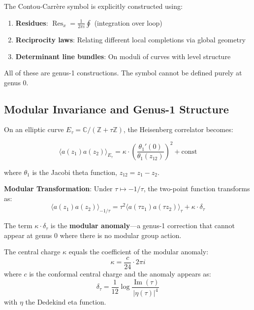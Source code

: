 \begin{remark}
The Contou-Carrère symbol is explicitly constructed using:
\begin{enumerate}
\item \textbf{Residues}: $\operatorname{Res}_x = \frac{1}{2\pi i} \oint$ (integration over loop)
\item \textbf{Reciprocity laws}: Relating different local completions via global geometry
\item \textbf{Determinant line bundles}: On moduli of curves with level structure
\end{enumerate}
All of these are genus-1 constructions. The symbol cannot be defined purely at genus 0.
\end{remark}

\subsection{Modular Invariance and Genus-1 Structure}

On an elliptic curve $E_\tau = \mathbb{C}/(\mathbb{Z} + \tau \mathbb{Z})$, the Heisenberg correlator becomes:

\begin{equation}
\langle a(z_1) a(z_2) \rangle_{E_\tau} = \kappa \cdot \left( \frac{\theta_1'(0)}{\theta_1(z_{12})} \right)^2 + \text{const}
\end{equation}

where $\theta_1$ is the Jacobi theta function, $z_{12} = z_1 - z_2$.

\textbf{Modular Transformation}:
Under $\tau \mapsto -1/\tau$, the two-point function transforms as:
\begin{equation}
\langle a(z_1) a(z_2) \rangle_{-1/\tau} = \tau^2 \langle a(\tau z_1) a(\tau z_2) \rangle_\tau + \kappa \cdot \delta_\tau
\end{equation}

The term $\kappa \cdot \delta_\tau$ is the \textbf{modular anomaly}---a genus-1 correction that cannot appear at genus 0 where there is no modular group action.

\begin{theorem}
The central charge $\kappa$ equals the coefficient of the modular anomaly:
\begin{equation}
\kappa = \frac{c}{24} \cdot 2\pi i
\end{equation}
where $c$ is the conformal central charge and the anomaly appears as:
\begin{equation}
\delta_\tau = \frac{1}{12} \log \frac{\operatorname{Im}(\tau)}{|\eta(\tau)|^4}
\end{equation}
with $\eta$ the Dedekind eta function.
\end{theorem}

